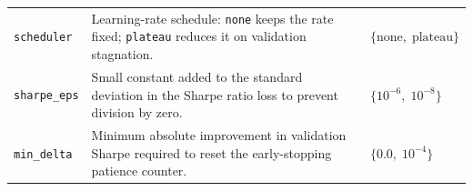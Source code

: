 \begin{longtable}{@{}p{3.7cm} p{7.5cm} p{3.3cm}@{}}
\texttt{scheduler} & Learning-rate schedule: \texttt{none} keeps the rate fixed; \texttt{plateau} reduces it on validation stagnation. & $\{\text{none},\;\text{plateau}\}$ \\[4pt]
 
\texttt{sharpe\_eps} & Small constant added to the standard deviation in the Sharpe ratio loss to prevent division by zero. & $\{10^{-6},\;10^{-8}\}$ \\[4pt]
 
\texttt{min\_delta} & Minimum absolute improvement in validation Sharpe required to reset the early-stopping patience counter. & $\{0.0,\;10^{-4}\}$ \\[6pt]
 

\bottomrule
\end{longtable}